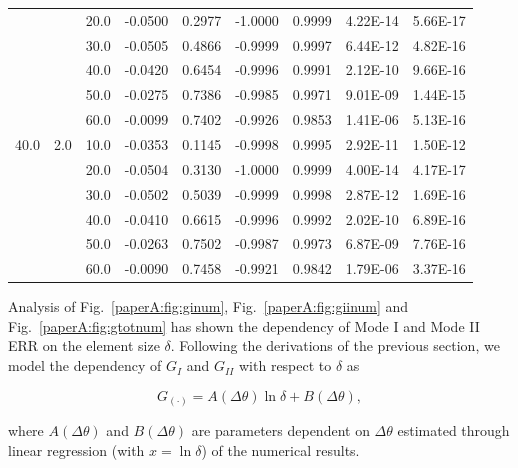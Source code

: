 \begin{table}[!h]
\begin{tabular}{ccccccccc}
&\small&\small		20.0&\small	-0.0500&\small	0.2977&\small	-1.0000&\small	0.9999&\small	4.22E-14&\small	5.66E-17\\
&\small&\small		30.0&\small	-0.0505&\small	0.4866&\small	-0.9999&\small	0.9997&\small	6.44E-12&\small	4.82E-16\\
&\small&\small		40.0&\small	-0.0420&\small	0.6454&\small	-0.9996&\small	0.9991&\small	2.12E-10&\small	9.66E-16\\
&\small&\small		50.0&\small	-0.0275&\small	0.7386&\small	-0.9985&\small	0.9971&\small	9.01E-09&\small	1.44E-15\\
&\small&\small		60.0&\small	-0.0099&\small	0.7402&\small	-0.9926&\small	0.9853&\small	1.41E-06&\small	5.13E-16\\
\midrule
\small40.0&\small	2.0&\small	10.0&\small	-0.0353&\small	0.1145&\small	-0.9998&\small	0.9995&\small	2.92E-11&\small	1.50E-12\\
&\small&\small		20.0&\small	-0.0504&\small	0.3130&\small	-1.0000&\small	0.9999&\small	4.00E-14&\small	4.17E-17\\
&\small&\small		30.0&\small	-0.0502&\small	0.5039&\small	-0.9999&\small	0.9998&\small	2.87E-12&\small	1.69E-16\\
&\small&\small		40.0&\small	-0.0410&\small	0.6615&\small	-0.9996&\small	0.9992&\small	2.02E-10&\small	6.89E-16\\
&\small&\small		50.0&\small	-0.0263&\small	0.7502&\small	-0.9987&\small	0.9973&\small	6.87E-09&\small	7.76E-16\\
&\small&\small		60.0&\small	-0.0090&\small	0.7458&\small	-0.9921&\small	0.9842&\small	1.79E-06&\small	3.37E-16\\
\end{tabular}
\end{table}

Analysis of Fig.~\ref{paperA:fig:ginum}, Fig.~\ref{paperA:fig:giinum} and Fig.~\ref{paperA:fig:gtotnum} has shown the dependency of Mode I and Mode II ERR on the element size $\delta$. Following the derivations of the previous section, we model the dependency of $G_{I}$ and $G_{II}$ with respect to $\delta$ as

\begin{equation}
G_{\left(\cdot\right)}=A\left(\Delta\theta\right)\ln\delta+B\left(\Delta\theta\right),
\end{equation}

where $A\left(\Delta\theta\right)$ and $B\left(\Delta\theta\right)$ are parameters dependent on $\Delta\theta$ estimated through linear regression (with $x=\ln\delta$) of the numerical results.

